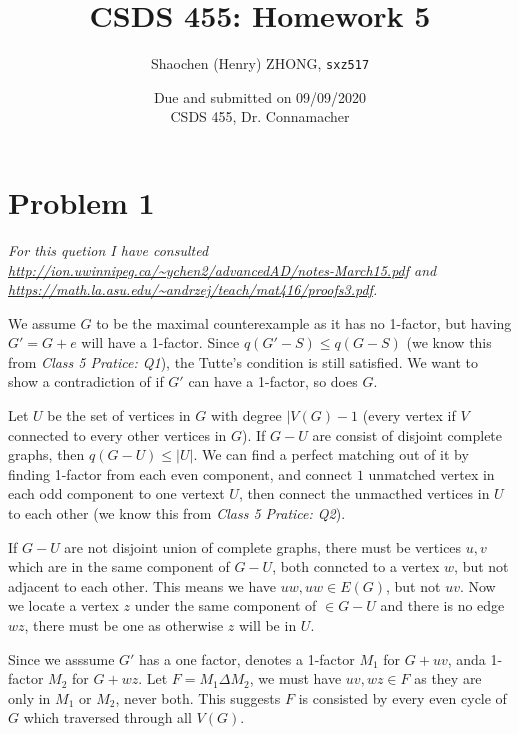 \documentclass[11pt]{article}
\newcommand{\ilc}{\texttt}
\begin{document}
\title{\textbf{CSDS 455: Homework 5}}

\author{Shaochen (Henry) ZHONG, \ilc{sxz517}}
\date{Due and submitted on 09/09/2020 \\ CSDS 455, Dr. Connamacher}
\maketitle

\section{Problem 1}

\textit{For this quetion I have consulted \url{http://ion.uwinnipeg.ca/~ychen2/advancedAD/notes-March15.pdf} and \url{https://math.la.asu.edu/~andrzej/teach/mat416/proofs3.pdf}.}\newline


We assume $G$ to be the maximal counterexample as it has no 1-factor, but having $G' = G+e$ will have a 1-factor. Since $q(G'-S) \leq q(G-S)$ (we know this from \textit{Class 5 Pratice: Q1}), the Tutte's condition is still satisfied. We want to show a contradiction of if $G'$ can have a 1-factor, so does $G$.\newline

Let $U$ be the set of vertices in $G$ with degree $|V(G)-1$ (every vertex if $V$ connected to every other vertices in $G$). If $G-U$ are consist of disjoint complete graphs, then $q(G-U) \leq |U|$. We can find a perfect matching out of it by finding 1-factor from each even component, and connect $1$ unmatched vertex in each odd component to one vertext $U$, then connect the unmacthed vertices in $U$ to each other (we know this from \textit{Class 5 Pratice: Q2}).\newline

If $G-U$ are not disjoint union of complete graphs, there must be vertices $u, v$ which are in the same component of $G-U$, both conncted to a vertex $w$, but not adjacent to each other. This means we have $uw, uw \in E(G)$, but not $uv$. Now we locate a vertex $z$ under the same component of $\in G-U$ and there is no edge $wz$, there must be one as otherwise $z$ will be in $U$.

Since we asssume $G'$ has a one factor, denotes a 1-factor $M_1$ for $G+uv$, anda 1-factor $M_2$ for $G+wz$. Let $F = M_1 \Delta M_2$, we must have $uv, wz \in F$ as they are only in $M_1$ or $M_2$, never both. This suggests $F$ is consisted by every even cycle of $G$ which traversed through all $V(G)$.\newline
\end{document}
